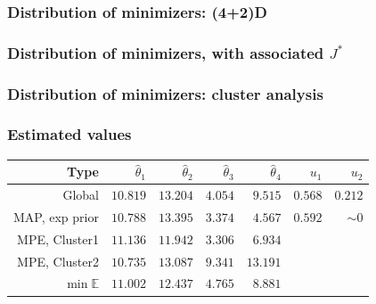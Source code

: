 \documentclass[11pt]{beamer}
\newcommand{\Ex}{\mathbb{E}}
\newcommand{\kk}{\theta}
\newcommand{\uu}{u}
\newcommand\manupath{/home/victor/acadwriting/Manuscrit/Text/}
\begin{document}
\begin{frame}
    \renewcommand\rmfamily{\sffamily}
  \frametitle{Distribution of minimizers: (4+2)D}
  \resizebox{\textwidth}{!}{}
\end{frame}
\begin{frame}
    \renewcommand\rmfamily{\sffamily}
  \frametitle{Distribution of minimizers, with associated $J^*$}
\end{frame}

\begin{frame}
    \renewcommand\rmfamily{\sffamily}
  \frametitle{Distribution of minimizers: cluster analysis}
\end{frame}
\begin{frame}
  \frametitle{Estimated values}
  \begin{table}[!h]
    \centering
    \begin{tabular}{rrrrrrr}\toprule
      Type &$\hat{\kk}_1$&$\hat{\kk}_2$&$\hat{\kk}_3$&$\hat{\kk}_4$&$\uu_1$&$\uu_2$ \\ \midrule
      Global & $10.819$ & $13.204$ & $4.054$ & $9.515$ & $0.568$ & $0.212$  \\
            MAP, exp prior & $10.788$ & $13.395$ &$3.374 $ & $4.567$& $0.592$ & $ \sim 0$  \\
      MPE, Cluster1 & $11.136$ & $11.942$& $3.306$ & $6.934$& &  \\
      MPE, Cluster2 & $10.735$ & $13.087$& $9.341$ & $13.191$& &  \\
      $\min \Ex$ & $11.002$ & $12.437$ & $4.765$ & $8.881$& & \\%
      \bottomrule
    \end{tabular}
  \end{table}
\end{frame}
\end{document}
